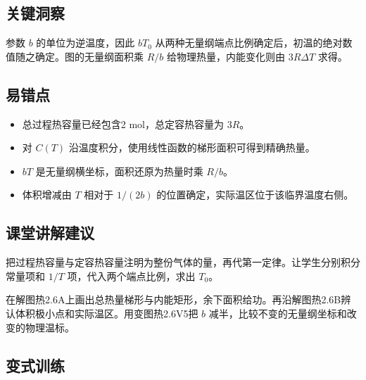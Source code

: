 \documentclass[UTF8,fontset=fandol,a4paper,11pt]{ctexart}
\begin{document}
\subsection*{关键洞察}

参数 $b$ 的单位为逆温度，因此 $bT_0$ 从两种无量纲端点比例确定后，初温的绝对数值随之确定。图的无量纲面积乘 $R/b$ 给物理热量，内能变化则由 $3R\Delta T$ 求得。



\subsection*{易错点}

\begin{itemize}
\item 总过程热容量已经包含2 mol，总定容热容量为 $3R$。
\item 对 $C(T)$ 沿温度积分，使用线性函数的梯形面积可得到精确热量。
\item $bT$ 是无量纲横坐标，面积还原为热量时乘 $R/b$。
\item 体积增减由 $T$ 相对于 $1/(2b)$ 的位置确定，实际温区位于该临界温度右侧。
\end{itemize}



\subsection*{课堂讲解建议}

把过程热容量与定容热容量注明为整份气体的量，再代第一定律。让学生分别积分常量项和 $1/T$ 项，代入两个端点比例，求出 $T_0$。

在解图热2.6A上画出总热量梯形与内能矩形，余下面积给功。再沿解图热2.6B辨认体积极小点和实际温区。用变图热2.6V5把 $b$ 减半，比较不变的无量纲坐标和改变的物理温标。



\subsection*{变式训练}
\end{document}
